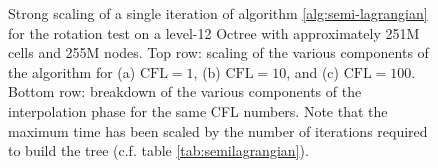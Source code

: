 \begin{figure}[htbp]
\begin{center}
	\end{center}
	\caption{Strong scaling of a single iteration of algorithm \ref{alg:semi-lagrangian} for the rotation test on a level-12 Octree with approximately 251M cells and 255M nodes. Top row: scaling of the various components of the algorithm for (a) $\text{CFL} = 1$, (b) $\text{CFL} = 10$, and (c) $\text{CFL} = 100$. Bottom row: breakdown of the various components of the interpolation phase for the same CFL numbers. Note that the maximum time has been scaled by the number of iterations required to build the tree (c.f. table \ref{tab:semilagrangian}).}
	\label{fig:semilagrangian_large}
\end{figure}

